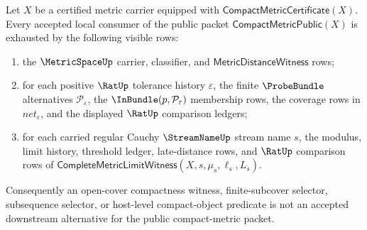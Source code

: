 \begin{theorem}
\label{thm:compactmetric-public-downstream-coverage}
Let $X$ be a certified metric carrier equipped with
$\mathsf{CompactMetricCertificate}(X)$. Every accepted local consumer of the
public packet $\mathsf{CompactMetricPublic}(X)$ is exhausted by the following
visible rows:
\begin{enumerate}
  \item the $\MetricSpaceUp$ carrier, classifier, and
  $\mathsf{MetricDistanceWitness}$ rows;
  \item for each positive $\RatUp$ tolerance history $\varepsilon$, the finite
  $\ProbeBundle$ alternatives $\mathcal{P}_{\varepsilon}$, the
  $\InBundle(p,\mathcal{P}_{\varepsilon})$ membership rows, the coverage rows
  in $net_{\varepsilon}$, and the displayed $\RatUp$ comparison ledgers;
  \item for each carried regular Cauchy $\StreamNameUp$ stream name $s$, the
  modulus, limit history, threshold ledger, late-distance rows, and $\RatUp$
  comparison rows of
  $\mathsf{CompleteMetricLimitWitness}(X,s,\mu_s,\ell_s,L_s)$.
\end{enumerate}
Consequently an open-cover compactness witness, finite-subcover selector,
subsequence selector, or host-level compact-object predicate is not an
accepted downstream alternative for the public compact-metric packet.
\end{theorem}
